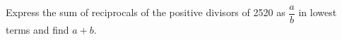 Express the sum of reciprocals of the positive divisors of 2520 as $\dfrac{a}{b}$ in lowest terms and find $a+b$.
